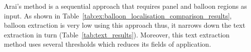
Arai's method is a sequential approach that requires panel and balloon regions as input.
As shown in Table~\ref{tab:ex:balloon_localisation_comparison_results}, balloon extraction is very low using this approach thus, it narrows down the text extraction in turn (Table~\ref{tab:text_results}).
Moreover, this text extraction method uses several thresholds which reduces its fields of application.


